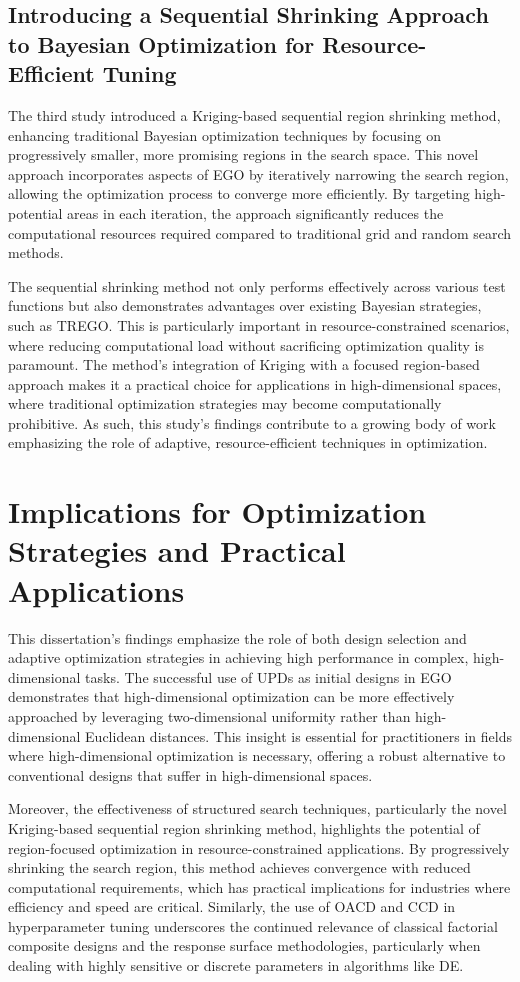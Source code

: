\subsection{Introducing a Sequential Shrinking Approach to Bayesian Optimization for Resource-Efficient Tuning}
The third study introduced a Kriging-based sequential region shrinking method, enhancing traditional Bayesian optimization techniques by focusing on progressively smaller, more promising regions in the search space. This novel approach incorporates aspects of EGO by iteratively narrowing the search region, allowing the optimization process to converge more efficiently. By targeting high-potential areas in each iteration, the approach significantly reduces the computational resources required compared to traditional grid and random search methods.

The sequential shrinking method not only performs effectively across various test functions but also demonstrates advantages over existing Bayesian strategies, such as TREGO. This is particularly important in resource-constrained scenarios, where reducing computational load without sacrificing optimization quality is paramount. The method's integration of Kriging with a focused region-based approach makes it a practical choice for applications in high-dimensional spaces, where traditional optimization strategies may become computationally prohibitive. As such, this study's findings contribute to a growing body of work emphasizing the role of adaptive, resource-efficient techniques in optimization.

\section{Implications for Optimization Strategies and Practical Applications}

This dissertation's findings emphasize the role of both design selection and adaptive optimization strategies in achieving high performance in complex, high-dimensional tasks. The successful use of UPDs as initial designs in EGO demonstrates that high-dimensional optimization can be more effectively approached by leveraging two-dimensional uniformity rather than high-dimensional Euclidean distances. This insight is essential for practitioners in fields where high-dimensional optimization is necessary, offering a robust alternative to conventional designs that suffer in high-dimensional spaces.

Moreover, the effectiveness of structured search techniques, particularly the novel Kriging-based sequential region shrinking method, highlights the potential of region-focused optimization in resource-constrained applications. By progressively shrinking the search region, this method achieves convergence with reduced computational requirements, which has practical implications for industries where efficiency and speed are critical. Similarly, the use of OACD and CCD in hyperparameter tuning underscores the continued relevance of classical factorial composite designs and the  response surface methodologies, particularly when dealing with highly sensitive or discrete parameters in algorithms like DE.

